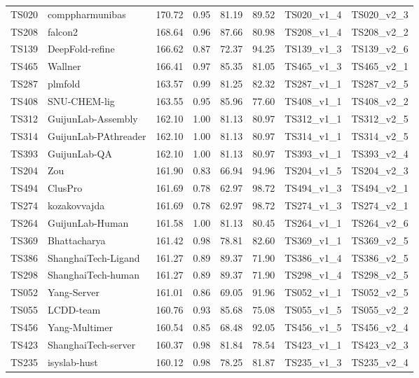 \begin{longtable}{llllllll}
TS020 & comppharmunibas & 170.72 & 0.95 & 81.19 & 89.52 & TS020\_v1\_4 & TS020\_v2\_3 \\ 
TS208 & falcon2 & 168.64 & 0.96 & 87.66 & 80.98 & TS208\_v1\_4 & TS208\_v2\_2 \\ 
TS139 & DeepFold-refine & 166.62 & 0.87 & 72.37 & 94.25 & TS139\_v1\_3 & TS139\_v2\_6 \\ 
TS465 & Wallner & 166.41 & 0.97 & 85.35 & 81.05 & TS465\_v1\_3 & TS465\_v2\_1 \\ 
TS287 & plmfold & 163.57 & 0.99 & 81.25 & 82.32 & TS287\_v1\_1 & TS287\_v2\_5 \\ 
TS408 & SNU-CHEM-lig & 163.55 & 0.95 & 85.96 & 77.60 & TS408\_v1\_1 & TS408\_v2\_2 \\ 
TS312 & GuijunLab-Assembly & 162.10 & 1.00 & 81.13 & 80.97 & TS312\_v1\_1 & TS312\_v2\_5 \\ 
TS314 & GuijunLab-PAthreader & 162.10 & 1.00 & 81.13 & 80.97 & TS314\_v1\_1 & TS314\_v2\_5 \\ 
TS393 & GuijunLab-QA & 162.10 & 1.00 & 81.13 & 80.97 & TS393\_v1\_1 & TS393\_v2\_4 \\ 
TS204 & Zou & 161.90 & 0.83 & 66.94 & 94.96 & TS204\_v1\_5 & TS204\_v2\_3 \\ 
TS494 & ClusPro & 161.69 & 0.78 & 62.97 & 98.72 & TS494\_v1\_3 & TS494\_v2\_1 \\ 
TS274 & kozakovvajda & 161.69 & 0.78 & 62.97 & 98.72 & TS274\_v1\_3 & TS274\_v2\_1 \\ 
TS264 & GuijunLab-Human & 161.58 & 1.00 & 81.13 & 80.45 & TS264\_v1\_1 & TS264\_v2\_6 \\ 
TS369 & Bhattacharya & 161.42 & 0.98 & 78.81 & 82.60 & TS369\_v1\_1 & TS369\_v2\_5 \\ 
TS386 & ShanghaiTech-Ligand & 161.27 & 0.89 & 89.37 & 71.90 & TS386\_v1\_4 & TS386\_v2\_5 \\ 
TS298 & ShanghaiTech-human & 161.27 & 0.89 & 89.37 & 71.90 & TS298\_v1\_4 & TS298\_v2\_5 \\ 
TS052 & Yang-Server & 161.01 & 0.86 & 69.05 & 91.96 & TS052\_v1\_1 & TS052\_v2\_5 \\ 
TS055 & LCDD-team & 160.76 & 0.93 & 85.68 & 75.08 & TS055\_v1\_5 & TS055\_v2\_2 \\ 
TS456 & Yang-Multimer & 160.54 & 0.85 & 68.48 & 92.05 & TS456\_v1\_5 & TS456\_v2\_4 \\ 
TS423 & ShanghaiTech-server & 160.37 & 0.98 & 81.84 & 78.54 & TS423\_v1\_1 & TS423\_v2\_3 \\ 
TS235 & isyslab-hust & 160.12 & 0.98 & 78.25 & 81.87 & TS235\_v1\_3 & TS235\_v2\_4 \\ 

\end{longtable}
